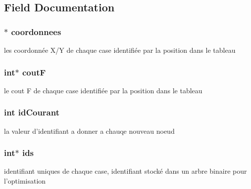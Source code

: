 \subsection{Field Documentation}
\hypertarget{struct_liste_a6b0177fa630b778a8f03f1a9ef2411b6}{
\subsubsection[{coordonnees}]{$\ast$ coordonnees}}\label{struct_liste_a6b0177fa630b778a8f03f1a9ef2411b6}


les coordonnée X/\-Y de chaque case identifiée par la position dans le tableau 

\hypertarget{struct_liste_ad648f067f3cc86c9b8f8222e2014ad26}{
\subsubsection[{cout\-F}]{\setlength{\rightskip}{0pt plus 5cm}int$\ast$ cout\-F}}\label{struct_liste_ad648f067f3cc86c9b8f8222e2014ad26}


le cout F de chaque case identifiée par la position dans le tableau 

\hypertarget{struct_liste_a854832481703f0bfbc8937240f580f84}{
\subsubsection[{id\-Courant}]{\setlength{\rightskip}{0pt plus 5cm}int id\-Courant}}\label{struct_liste_a854832481703f0bfbc8937240f580f84}


la valeur d'identifiant a donner a chauqe nouveau noeud 

\hypertarget{struct_liste_a6081d5fc46a8899b4beb60b0df7dd190}{
\subsubsection[{ids}]{\setlength{\rightskip}{0pt plus 5cm}int$\ast$ ids}}\label{struct_liste_a6081d5fc46a8899b4beb60b0df7dd190}


identifiant uniques de chaque case, identifiant stocké dans un arbre binaire pour l'optimisation 

